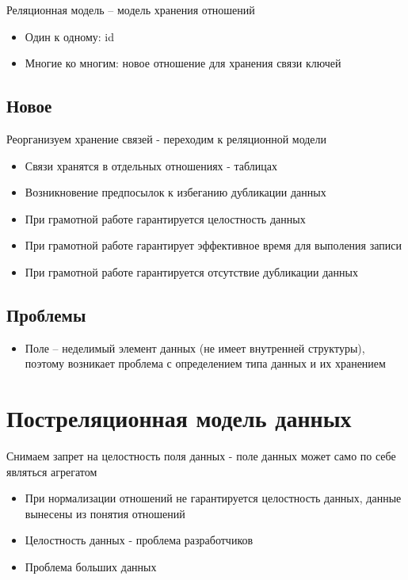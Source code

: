 \documentclass[12pt, a4paper]{article}
\begin{document}
Реляционная модель -- модель хранения отношений
\begin{itemize}
    \item Один к одному: id
    \item Многие ко многим: новое отношение для хранения связи ключей
\end{itemize}

\subsection{Новое}
Реорганизуем хранение связей - переходим к реляционной модели
\begin{itemize}
    \item Связи хранятся в отдельных отношениях - таблицах
    \item Возникновение предпосылок к избеганию дубликации данных
    \item При грамотной работе гарантируется целостность данных
    \item При грамотной работе гарантирует эффективное время для  выполения записи
    \item При грамотной работе гарантируется отсутствие дубликации данных
\end{itemize}

\subsection{Проблемы}

\begin{itemize}
    \item Поле -- неделимый элемент данных (не имеет внутренней структуры), поэтому возникает проблема с определением типа данных и их хранением
\end{itemize}

\newpage

\section{Постреляционная модель данных}

Снимаем запрет на целостность поля данных - поле данных может само по себе являться агрегатом

\begin{itemize}
    \item При нормализации отношений не гарантируется целостность данных, данные вынесены из понятия отношений
    \item Целостность данных - проблема разработчиков
    \item Проблема больших данных
\end{itemize}
\end{document}
